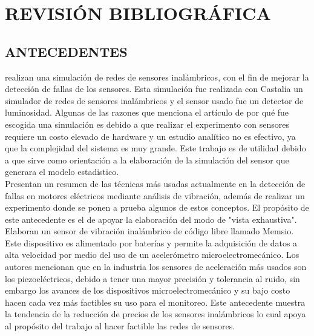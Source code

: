 \thispagestyle{empty}

	\section{REVISIÓN BIBLIOGRÁFICA}


\subsection{ANTECEDENTES}

\textcite{Pinto} realizan una simulación de redes de sensores inalámbricos, con el fin de mejorar la detección de fallas de los sensores. Esta simulación fue realizada con Castalia un simulador de redes de sensores inalámbricos y el sensor usado fue un detector de luminosidad. Algunas de las razones que menciona el artículo de por qué fue escogida una simulación es debido a que realizar el experimento con sensores requiere un costo elevado de hardware y un estudio analítico no es efectivo, ya que la complejidad del sistema es muy grande. Este trabajo es de utilidad debido a que sirve como orientación a la elaboración de la simulación del sensor que generara el modelo estadistico.\\


\textcite{Ugwiri} Presentan un resumen de las técnicas más usadas actualmente en la detección de fallas en motores eléctricos mediante análisis de vibración, además de realizar un experimento donde se ponen a prueba algunos de estos conceptos. El propósito de este antecedente es el de apoyar la elaboración del modo de "vista exhaustiva".\\


\textcite{Koene} Elaboran un sensor de vibración inalámbrico de código libre llamado Memsio. Este dispositivo es alimentado por baterías y permite la adquisición de datos a alta velocidad por medio del uso de un acelerómetro microelectromecánico. Los autores mencionan que en la industria los sensores de aceleración más usados son los piezoeléctricos, debido a tener una mayor precisión y tolerancia al ruido, sin embargo los avances de los dispositivos microelectromecánico y su bajo costo hacen cada vez más factibles su uso para el monitoreo. Este antecedente muestra la tendencia de la reducción de precios de los sensores inalámbricos lo cual apoya al propósito del trabajo al hacer factible las redes de sensores.
